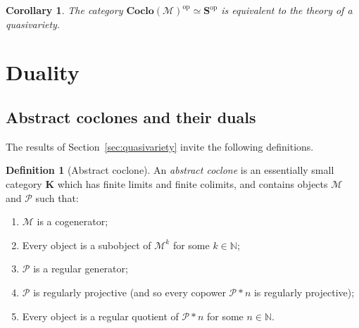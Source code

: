\documentclass[11pt, a4paper, twoside,leqno]{amsart}
\newcommand{\cat}[1]{\mathbf{#1}}
\numberwithin{equation}{section}
\theoremstyle{plain}
\newtheorem{Cor}[Thm]{Corollary}
\theoremstyle{definition}
\newtheorem{Defn}[Thm]{Definition}
\begin{document}
\begin{Cor}
  \label{cor:cocloMop-qv-theory}
  The category \(\cat{Coclo}(\mathcal{M})^{\mathrm{op}}\simeq \cat{S}^{\mathrm{op}}\) is
  equivalent to the theory of a quasivariety.
\end{Cor}




\section{Duality}
\label{sec:duality}

\subsection{Abstract coclones and their duals}
\label{sec:ARClo-QClo}

The results of Section~\ref{sec:quasivariety} invite the following
definitions.

\begin{Defn}[Abstract coclone]
  \label{def:arc}
  An \emph{abstract coclone} is an essentially small category
  \(\cat{K}\) which has
  finite limits and finite colimits, and contains objects
  \(\mathcal{M}\) and \(\mathcal{P}\) such that: 
  \begin{enumerate}[label=(\alph*), ref=(\alph*)]
  \item
    \label{it:arc-cogen}
    \(\mathcal{M}\) is a cogenerator;

    \item
    \label{it:arc-sub-J}
    Every object is a subobject of \(\mathcal{M}^{k}\) for some \(k \in
    \mathbb{N}\);
    
  \item
    \label{it:arc-reg-gen}
    \(\mathcal{P}\) is a regular generator;
    
  \item 
    \label{it:arc-reg-proj}
    \(\mathcal{P}\) is regularly projective (and so every copower \(\mathcal{P}\ast n\) is
    regularly projective);

  \item
    \label{it:arc-reg-quot}
    Every object is a regular quotient of \(\mathcal{P}\ast n\) for some
    \(n \in \mathbb{N}\).  
  \end{enumerate}
\end{Defn}
\end{document}
